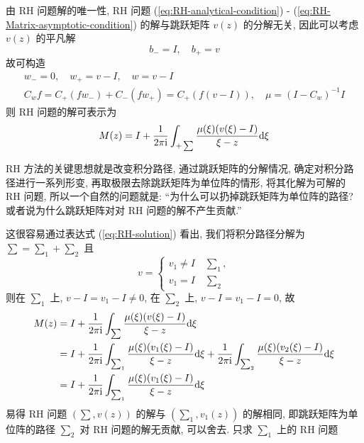 \begin{remark}
由 RH 问题解的唯一性, RH 问题 (\ref{eq:RH-analytical-condition}) - (\ref{eq:RH-Matrix-asymptotic-condition}) 的解与跳跃矩阵 $ v(z) $ 的分解无关, 因此可以考虑 $ v(z) $ 的平凡解
\begin{equation}
  b_{-} = I, \quad b_{+} = v
\end{equation}
故可构造
\begin{equation}
  \begin{aligned}
    w_{-} = 0, \quad w_{+} = v - I, \quad w = v - I \\
    C_{w}f =  C_{+}(fw_{-}) + C_{-}(fw_{+}) = C_{+}(f(v - I)), \quad \mu = (I - C_{w})^{-1}I
  \end{aligned}
\end{equation}
则 RH 问题的解可表示为
\begin{equation}
  M(z) = I + \frac{1}{2 \pi \mathrm{i}} \int_{+\sum} \frac{\mu(\xi) (v(\xi) - I)}{\xi - z}  \mathrm{d} \xi \label{eq:RH-solution}
\end{equation}
\end{remark}

\begin{remark}
  RH 方法的关键思想就是改变积分路径, 通过跳跃矩阵的分解情况, 确定对积分路径进行一系列形变, 再取极限去除跳跃矩阵为单位阵的情形, 将其化解为可解的 RH 问题, 所以一个自然的问题就是: ``为什么可以扔掉跳跃矩阵为单位阵的路径? 或者说为什么跳跃矩阵对对 RH 问题的解不产生贡献.''

  这很容易通过表达式 (\ref{eq:RH-solution}) 看出, 我们将积分路径分解为 $ \sum = \sum_{1} + \sum_{2} $ 且 
  \begin{equation}
    v = \begin{cases}
      v_1 \neq I \quad \sum_{1}, \\
      v_1 = I \quad \sum_{2}
    \end{cases}
  \end{equation}
  则在 $ \sum_{1} $ 上, $ v- I = v_{1} - I \neq 0 $, 在 $ \sum_{2} $ 上, $ v- I = v_{1} - I = 0 $, 故
  \begin{equation}
    \begin{aligned}
      M(z) &= I + \frac{1}{2 \pi \mathrm{i}} \int_{\sum} \frac{\mu(\xi) (v(\xi) - I)}{\xi - z}  \mathrm{d} \xi \\
        &= I + \frac{1}{2 \pi \mathrm{i}} \int_{\sum_{1}} \frac{\mu(\xi) (v_{1}(\xi) - I)}{\xi - z}  \mathrm{d} \xi + \frac{1}{2 \pi \mathrm{i}} \int_{\sum_{2}} \frac{\mu(\xi) (v_{2}(\xi) - I)}{\xi - z}  \mathrm{d} \xi \\
        &= I + \frac{1}{2 \pi \mathrm{i}} \int_{\sum_1} \frac{\mu(\xi) (v_{1}(\xi) - I)}{\xi - z}  \mathrm{d} \xi
    \end{aligned}
  \end{equation}
  易得 RH 问题 $ (\sum, v(z)) $ 的解与 $ (\sum_{1}, v_{1}(z)) $ 的解相同, 即跳跃矩阵为单位阵的路径 $ \sum_{2} $ 对 RH 问题的解无贡献, 可以舍去. 只求 $ \sum_{1} $ 上的 RH 问题
\end{remark}